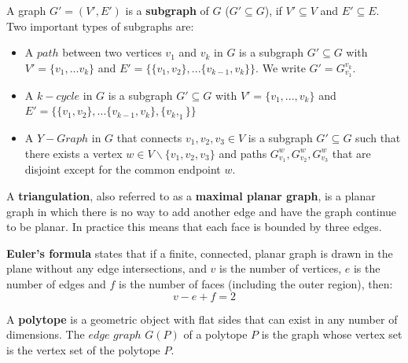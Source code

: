 \documentclass{article}
\begin{document}
  A graph $G' = (V',E')$ is a \textbf{subgraph} of $G$ ($G' \subseteq G$), if $V' \subseteq V$ and $E' \subseteq E$. Two important types of subgraphs are:
  \begin{itemize}
  \item A $path$ between two vertices $v_1$ and $v_k$ in $G$ is a subgraph $G' \subseteq G$ with $V' = \{v_1,...v_k\}$ and $E' 	= \{\{v_1,v_2\},...\{v_{k-1}, v_k\}\}$. We write $G' = G_{v_1}^{v_k}$.
  \item A $k-cycle$ in $G$ is a subgraph $G'\subseteq G$ with $V' = \{v_1,...,v_k\}$ and $E' = \{\{v_1,v_2\},...\{v_{k-1}, v_k\}, \{v_k,_1\}\}$
  \item A $Y-Graph$ in $G$ that connects $v_1,v_2, v_3 \in V$ is a subgraph $G' \subseteq G$ such that there exists a vertex $w \in V \backslash \{v_1,v_2, v_3\}$ and paths $G_{v_1}^w, G_{v_2}^w, G_{v_3}^w$ that are disjoint except for the common endpoint $w$.
  \end{itemize}
  A \textbf{triangulation}, also referred to as a \textbf{maximal planar graph}, is a planar graph in which there is no way to add another edge and have the graph continue to be planar. In practice this means that each face is bounded by three edges\citep{mathworld:Triangulation}.
  
  \textbf{Euler's formula} states that if a finite, connected, planar graph is drawn in the plane without any edge intersections, and $v$ is the number of vertices, $e$ is the number of edges and $f$ is the number of faces (including the outer region), then: 
  \begin{equation} 
	v-e+f=2
  \end{equation}
  
  A \textbf{polytope} is a geometric object with flat sides that can exist in any number of dimensions. The $edge$ $graph$ $G(P)$ of a polytope $P$ is the graph whose vertex set is the vertex set of the polytope $P$. 
  
\end{document}

